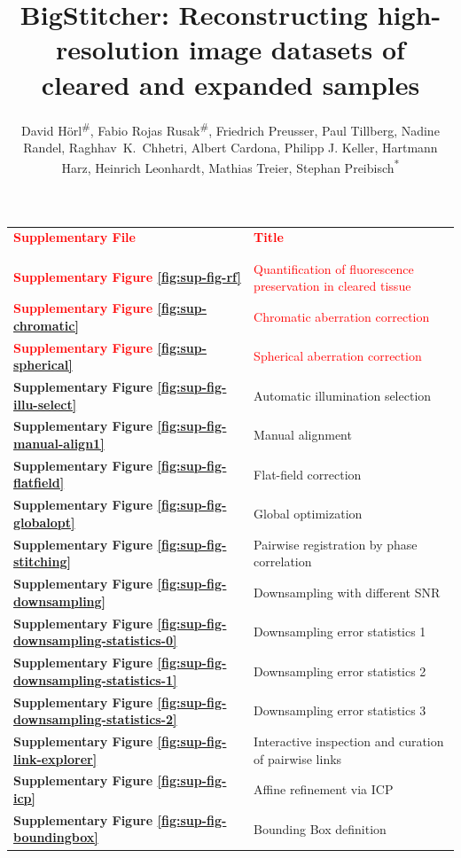 \documentclass[]{spie}  %
\title{BigStitcher: Reconstructing high-resolution image datasets of cleared and expanded samples}
\author{David H{\"o}rl\textsuperscript{\#}, Fabio Rojas Rusak\textsuperscript{\#}, Friedrich Preusser, Paul Tillberg, Nadine Randel, Raghhav~K.~Chhetri, Albert Cardona, Philipp J. Keller, Hartmann Harz, Heinrich Leonhardt, Mathias Treier, Stephan Preibisch\textsuperscript{*}
}
\def\red{\textcolor{red}}
\newcommand\tablespace{\vspace{2.5mm}}
\begin{document}
\maketitle

\setcounter{page}{1}


\hspace{20mm}

\begin{table}[h!]
\center
{
\fontsize{12pt}{11pt}\selectfont
\center
\begin{tabular}{lp{11cm}}
\textbf{\textcolor{red}{Supplementary File}} & \textbf{\textcolor{red}{Title}}\\ \\
\hline
\\
\textbf{\red{Supplementary Figure \ref{fig:sup-fig-rf}}} & \red{Quantification of fluorescence preservation in cleared tissue}\tablespace \\
\textbf{\red{Supplementary Figure \ref{fig:sup-chromatic}}} & \red{Chromatic aberration correction}\tablespace \\
\textbf{\red{Supplementary Figure \ref{fig:sup-spherical}}} & \red{Spherical aberration correction}\tablespace \\
\textbf{Supplementary Figure \ref{fig:sup-fig-illu-select}} & Automatic illumination selection \tablespace \\
\textbf{Supplementary Figure \ref{fig:sup-fig-manual-align1}} &  Manual alignment \tablespace \\
\textbf{Supplementary Figure \ref{fig:sup-fig-flatfield}} & Flat-field correction \tablespace \\
\textbf{Supplementary Figure \ref{fig:sup-fig-globalopt}} & Global optimization \tablespace \\
\textbf{Supplementary Figure \ref{fig:sup-fig-stitching}} & Pairwise registration by phase correlation \tablespace \\
\textbf{Supplementary Figure \ref{fig:sup-fig-downsampling}} & Downsampling with different SNR \tablespace \\
\textbf{Supplementary Figure \ref{fig:sup-fig-downsampling-statistics-0}} & Downsampling error statistics 1 \tablespace \\
\textbf{Supplementary Figure \ref{fig:sup-fig-downsampling-statistics-1}} & Downsampling error statistics 2 \tablespace \\
\textbf{Supplementary Figure \ref{fig:sup-fig-downsampling-statistics-2}} & Downsampling error statistics 3 \tablespace \\
\textbf{Supplementary Figure \ref{fig:sup-fig-link-explorer}} & Interactive inspection and curation of pairwise links \tablespace \\
\textbf{Supplementary Figure \ref{fig:sup-fig-icp}} & Affine refinement via ICP \tablespace \\
\textbf{Supplementary Figure \ref{fig:sup-fig-boundingbox}} & Bounding Box definition \tablespace \\


\end{tabular}}
\end{table}
\end{document}
